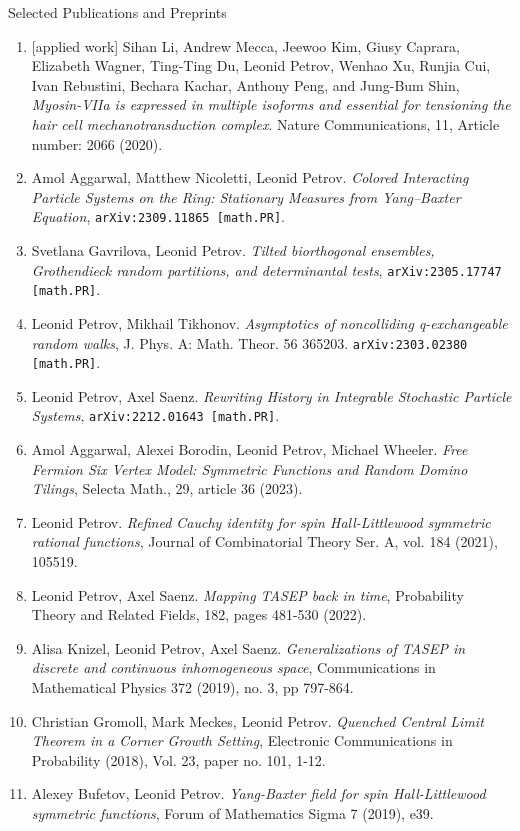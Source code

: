 \documentclass{amsart}
\begin{document}
\bigskip\noindent
{\sc Selected Publications and Preprints}

\begin{enumerate}
\item 
{[applied work]}
Sihan Li, Andrew Mecca, Jeewoo Kim, Giusy Caprara, Elizabeth Wagner, Ting-Ting Du, Leonid Petrov, Wenhao Xu, Runjia Cui, Ivan Rebustini, Bechara Kachar, Anthony Peng, and Jung-Bum Shin,
\emph{Myosin-VIIa is expressed in multiple isoforms and essential for tensioning the hair cell mechanotransduction complex}.
Nature Communications, 11, Article number: 2066 (2020). 
\item  Amol Aggarwal, Matthew Nicoletti, Leonid Petrov. \emph{Colored Interacting Particle Systems on the Ring: Stationary Measures from Yang--Baxter Equation}, \texttt{arXiv:2309.11865 [math.PR]}.
\item Svetlana Gavrilova, Leonid Petrov. \emph{Tilted biorthogonal ensembles, Grothendieck random partitions, and determinantal tests}, \texttt{arXiv:2305.17747 [math.PR]}.
\item Leonid Petrov, Mikhail Tikhonov. \emph{Asymptotics of noncolliding q-exchangeable random walks}, J. Phys. A: Math. Theor. 56 365203. \texttt{arXiv:2303.02380 [math.PR]}.
\item Leonid Petrov, Axel Saenz. \emph{Rewriting History in Integrable Stochastic Particle Systems}, \texttt{arXiv:2212.01643 [math.PR]}.
\item Amol Aggarwal, Alexei Borodin, Leonid Petrov, Michael Wheeler. \emph{Free Fermion Six Vertex Model: Symmetric Functions and Random Domino Tilings}, Selecta Math., 29, article 36 (2023).
\item Leonid Petrov. \emph{Refined Cauchy identity for spin Hall-Littlewood symmetric rational functions}, Journal of Combinatorial Theory Ser. A, vol. 184 (2021), 105519.
\item Leonid Petrov, Axel Saenz. \emph{Mapping TASEP back in time}, Probability Theory and Related Fields, 182, pages 481-530 (2022).
\item Alisa Knizel, Leonid Petrov, Axel Saenz. \emph{Generalizations of TASEP in discrete and continuous inhomogeneous space}, Communications in Mathematical Physics 372 (2019), no. 3, pp 797-864.
\item Christian Gromoll, Mark Meckes, Leonid Petrov. \emph{Quenched Central Limit Theorem in a Corner Growth Setting}, Electronic Communications in Probability (2018), Vol. 23, paper no. 101, 1-12.
\item Alexey Bufetov, Leonid Petrov. \emph{Yang-Baxter field for spin Hall-Littlewood symmetric functions}, Forum of Mathematics Sigma 7 (2019), e39.

\end{enumerate}
\end{document}
